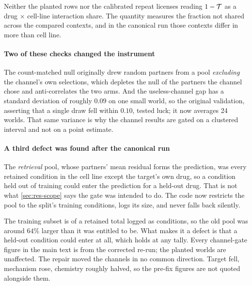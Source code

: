 \begin{scopelimit}
Neither the planted rows nor the calibrated repeat licenses reading
$1 - \mathcal{T}$ as a drug $\times$ cell-line interaction share. The quantity
measures the fraction not shared across the compared contexts, and in the
canonical run those contexts differ in more than cell line.
\end{scopelimit}

\paragraph{Two of these checks changed the instrument} The count-matched null
originally drew random partners from a pool \emph{excluding} the channel's own
selections, which depletes the null of the partners the channel chose and
anti-correlates the two arms. And the useless-channel gap has a standard
deviation of roughly $0.09$ on one small world, so the original validation,
asserting that a single draw fell within $0.10$, tested luck; it now averages 24
worlds. That same variance is why the channel results are gated on a clustered
interval and not on a point estimate.

\paragraph{A third defect was found after the canonical run} The \emph{retrieval}
pool, whose partners' mean residual forms the prediction, was every retained
condition in the cell line except the target's own drug, so a condition held out
of training could enter the prediction for a held-out drug. That is not what
\cref{sec:res-scope} says the gate was intended to do. The code now restricts
the pool to the split's training conditions, logs its size, and never falls back
silently.

The training subset is
 of a retained total logged as
 conditions, so the old
pool was around $64\%$ larger than it was entitled to be. What makes it a defect
is that a held-out condition could enter at all, which holds at any tally. Every
channel-gate figure in the main text is from the corrected
re-run; the planted worlds are unaffected. The
repair moved the channels in no common direction. Target fell, mechanism rose,
chemistry roughly halved, so the pre-fix figures are not quoted alongside them.

